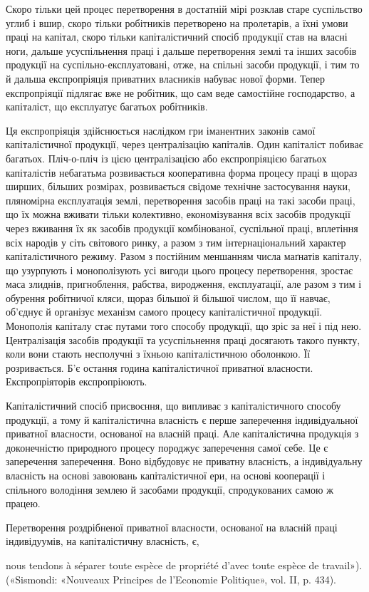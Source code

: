 Скоро тільки цей процес перетворення в достатній мірі розклав
старе суспільство углиб і вшир, скоро тільки робітників
перетворено на пролетарів, а їхні умови праці на капітал, скоро
тільки капіталістичний спосіб продукції став на власні ноги,
дальше усуспільнення праці і дальше перетворення землі та
інших засобів продукції на суспільно-експлуатовані, отже, на
спільні засоби продукції, і тим то й дальша експропріяція приватних
власників набуває нової форми. Тепер експропріяції
підлягає вже не робітник, що сам веде самостійне господарство,
а капіталіст, що експлуатує багатьох робітників.

Ця експропріяція здійснюється наслідком гри іманентних законів
самої капіталістичної продукції, через централізацію капіталів.
Один капіталіст побиває багатьох. Пліч-о-пліч із цією
централізацією або експропріяцією багатьох капіталістів небагатьма
розвивається кооперативна форма процесу праці в
щораз ширших, більших розмірах, розвивається свідоме технічне
застосування науки, пляномірна експлуатація землі, перетворення
засобів праці на такі засоби праці, що їх можна
вживати тільки колективно, економізування всіх засобів продукції
через вживання їх як засобів продукції комбінованої,
суспільної праці, вплетіння всіх народів у сіть світового ринку,
а разом з тим інтернаціональний характер капіталістичного режиму.
Разом з постійним меншанням числа маґнатів капіталу,
що узурпують і монополізують усі вигоди цього процесу перетворення,
зростає маса злиднів, пригноблення, рабства, виродження,
експлуатації, але разом з тим і обурення робітничої
кляси, щораз більшої й більшої числом, що її навчає, об’єднує
й організує механізм самого процесу капіталістичної продукції.
Монополія капіталу стає путами того способу продукції, що
зріс за неї і під нею. Централізація засобів продукції та усуспільнення
праці досягають такого пункту, коли вони стають
несполучні з їхньою капіталістичною оболонкою. Її розривається.
Б’є остання година капіталістичної приватної власности.
Експропріяторів експропріюють.

Капіталістичний спосіб присвоєння, що випливає з капіталістичного
способу продукції, а тому й капіталістична власність
є перше заперечення індивідуальної приватної власности, основаної
на власній праці. Але капіталістична продукція з доконечністю
природного процесу породжує заперечення самої себе.
Це є заперечення заперечення. Воно відбудовує не приватну
власність, а індивідуальну власність на основі завоювань капіталістичної
ери, на основі кооперації і спільного володіння землею
й засобами продукції, спродукованих самою ж працею.

Перетворення роздрібненої приватної власности, основаної
на власній праці індивідуумів, на капіталістичну власність, є,

nous tendons à séparer toute espèce de propriété d’avec toute espèce de
travail»). («Sismondi: «Nouveaux Principes de l’Economie Politique»,
vol. II, p. 434).
\parbreak{}  %
